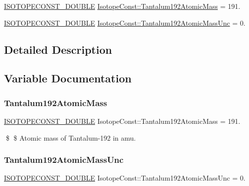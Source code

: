 \begin{DoxyCompactItemize}
\item 
\mbox{\hyperlink{group___isotope_const-_macros_ga8f45a7272ce02c0b4c65c44636ed719a}{I\+S\+O\+T\+O\+P\+E\+C\+O\+N\+S\+T\+\_\+\+D\+O\+U\+B\+LE}} \mbox{\hyperlink{group___isotope_const-_tantalum-_ta192_gacd83b78e8da04953818f11ec7a4a140d}{Isotope\+Const\+::\+Tantalum192\+Atomic\+Mass}} = 191.
\item 
\mbox{\hyperlink{group___isotope_const-_macros_ga8f45a7272ce02c0b4c65c44636ed719a}{I\+S\+O\+T\+O\+P\+E\+C\+O\+N\+S\+T\+\_\+\+D\+O\+U\+B\+LE}} \mbox{\hyperlink{group___isotope_const-_tantalum-_ta192_gab08fb50e5e026a983c22432d4407f897}{Isotope\+Const\+::\+Tantalum192\+Atomic\+Mass\+Unc}} = 0.
\end{DoxyCompactItemize}


\subsection{Detailed Description}


\subsection{Variable Documentation}
\mbox{\label{group___isotope_const-_tantalum-_ta192_gacd83b78e8da04953818f11ec7a4a140d}} 
\subsubsection{\texorpdfstring{Tantalum192\+Atomic\+Mass}{Tantalum192AtomicMass}}
{\footnotesize\ttfamily \mbox{\hyperlink{group___isotope_const-_macros_ga8f45a7272ce02c0b4c65c44636ed719a}{I\+S\+O\+T\+O\+P\+E\+C\+O\+N\+S\+T\+\_\+\+D\+O\+U\+B\+LE}} Isotope\+Const\+::\+Tantalum192\+Atomic\+Mass = 191.}

\$ \$ Atomic mass of Tantalum-\/192 in amu. \mbox{\label{group___isotope_const-_tantalum-_ta192_gab08fb50e5e026a983c22432d4407f897}} 
\subsubsection{\texorpdfstring{Tantalum192\+Atomic\+Mass\+Unc}{Tantalum192AtomicMassUnc}}
{\footnotesize\ttfamily \mbox{\hyperlink{group___isotope_const-_macros_ga8f45a7272ce02c0b4c65c44636ed719a}{I\+S\+O\+T\+O\+P\+E\+C\+O\+N\+S\+T\+\_\+\+D\+O\+U\+B\+LE}} Isotope\+Const\+::\+Tantalum192\+Atomic\+Mass\+Unc = 0.}

